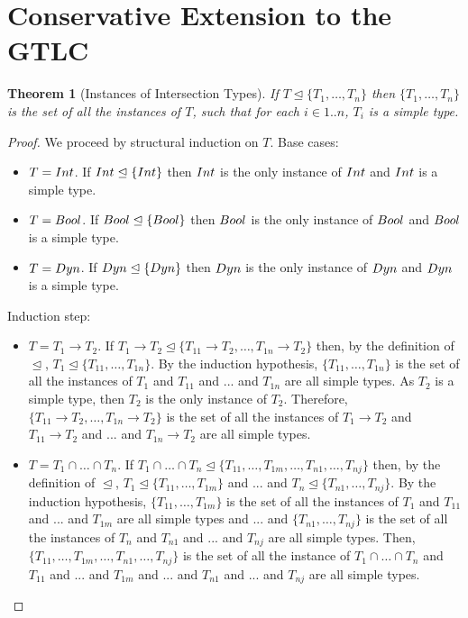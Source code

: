 \documentclass[a4paper]{article}
\newtheorem{theorem}{Theorem}[section]
\begin{document}
\section{Conservative Extension to the GTLC}
\begin{theorem}[Instances of Intersection Types]
\label{instances_intersection_types}
If $T \trianglelefteq \{T_1, \ldots, T_n\}$ then $\{T_1, \ldots, T_n\}$ is the set of all the instances of $T$, such that for each $i \in 1 .. n$, $T_i$ is a simple type.
\end{theorem}
\begin{proof}
We proceed by structural induction on $T$.
Base cases:
\begin{itemize}
    \item $T = {Int}$.
    If ${Int} \trianglelefteq \{{Int}\}$ then ${Int}$ is the only instance of ${Int}$ and ${Int}$ is a simple type.
    \item $T = Bool$.
    If $Bool \trianglelefteq \{Bool\}$ then $Bool$ is the only instance of $Bool$ and $Bool$ is a simple type.
    \item $T = Dyn$.
    If $Dyn \trianglelefteq \{Dyn\}$ then $Dyn$ is the only instance of $Dyn$ and $Dyn$ is a simple type.
\end{itemize}
Induction step:
\begin{itemize}
    \item $T = T_1 \rightarrow T_2$.
    If $T_1 \rightarrow T_2 \trianglelefteq \{T_{11} \rightarrow T_2, \ldots, T_{1n} \rightarrow T_2\}$ then, by the definition of $\trianglelefteq$, $T_1 \trianglelefteq \{T_{11}, \ldots, T_{1n}\}$.
    By the induction hypothesis, $\{T_{11}, \ldots, T_{1n}\}$ is the set of all the instances of $T_1$ and $T_{11}$ and ... and $T_{1n}$ are all simple types.
    As $T_2$ is a simple type, then $T_2$ is the only instance of $T_2$.
    Therefore, $\{T_{11} \rightarrow T_2, \ldots, T_{1n} \rightarrow T_2\}$ is the set of  all the instances of $T_1 \rightarrow T_2$ and $T_{11} \rightarrow T_2$ and ... and $T_{1n} \rightarrow T_2$ are all simple types.
    \item $T = T_1 \cap \ldots \cap T_n$.
    If $T_1 \cap \ldots \cap T_n \trianglelefteq \{T_{11}, \ldots, T_{1m}, \ldots, T_{n1}, \ldots, T_{nj}\}$ then, by the definition of $\trianglelefteq$, $T_1 \trianglelefteq \{T_{11}, \ldots, T_{1m}\}$ and ... and $T_n \trianglelefteq \{T_{n1}, \ldots, T_{nj}\}$.
    By the induction hypothesis, $\{T_{11}, \ldots, T_{1m}\}$ is the set of all the instances of $T_1$ and $T_{11}$ and ... and $T_{1m}$ are all simple types and ... and $\{T_{n1}, \ldots, T_{nj}\}$ is the set of all the instances of $T_n$ and $T_{n1}$ and ... and $T_{nj}$ are all simple types.
    Then, $\{T_{11}, \ldots, T_{1m}, \ldots, T_{n1}, \ldots, T_{nj}\}$ is the set of all the instance of $T_1 \cap \ldots \cap T_n$ and $T_{11}$ and ... and $T_{1m}$ and ... and $T_{n1}$ and ... and $T_{nj}$ are all simple types.
\end{itemize}
\end{proof}
\end{document}
